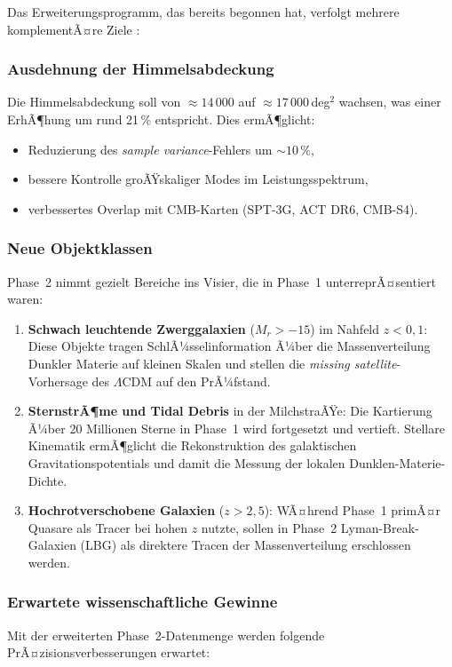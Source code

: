 ﻿\documentclass[a4paper,12pt]{article}
\theoremstyle{definition}
\theoremstyle{remark}
\begin{document}
Das Erweiterungsprogramm, das bereits begonnen hat, verfolgt mehrere
komplementÃ¤re Ziele \cite{desi2024dr1}:

\subsubsection*{Ausdehnung der Himmelsabdeckung}
Die Himmelsabdeckung soll von $\approx 14\,000$ auf $\approx 17\,000$\,deg$^2$
wachsen, was einer ErhÃ¶hung um rund 21\,\% entspricht. Dies ermÃ¶glicht:
\begin{itemize}
  \item Reduzierung des \textit{sample variance}-Fehlers um $\sim 10\,\%$,
  \item bessere Kontrolle groÃŸskaliger Modes im Leistungsspektrum,
  \item verbessertes Overlap mit CMB-Karten (SPT-3G, ACT DR6, CMB-S4).
\end{itemize}

\subsubsection*{Neue Objektklassen}
Phase~2 nimmt gezielt Bereiche ins Visier, die in Phase~1 unterreprÃ¤sentiert
waren:
\begin{enumerate}[label=\alph*)]
  \item \textbf{Schwach leuchtende Zwerggalaxien} ($M_r > -15$) im Nahfeld
    $z < 0{,}1$: Diese Objekte tragen SchlÃ¼sselinformation Ã¼ber die
    Massenverteilung Dunkler Materie auf kleinen Skalen und stellen die
    \textit{missing satellite}-Vorhersage des $\Lambda$CDM auf den PrÃ¼fstand.
  \item \textbf{SternstrÃ¶me und Tidal Debris} in der MilchstraÃŸe: Die Kartierung
    Ã¼ber 20 Millionen Sterne in Phase~1 wird fortgesetzt und vertieft.
    Stellare Kinematik ermÃ¶glicht die Rekonstruktion des galaktischen
    Gravitationspotentials und damit die Messung der lokalen Dunklen-Materie-Dichte.
  \item \textbf{Hochrotverschobene Galaxien} ($z > 2{,}5$): WÃ¤hrend Phase~1
    primÃ¤r Quasare als Tracer bei hohen $z$ nutzte, sollen in Phase~2
    Lyman-Break-Galaxien (LBG) als direktere Tracen der Massenverteilung
    erschlossen werden.
\end{enumerate}

\subsubsection*{Erwartete wissenschaftliche Gewinne}
Mit der erweiterten Phase~2-Datenmenge werden folgende PrÃ¤zisionsverbesserungen
erwartet:
\end{document}
